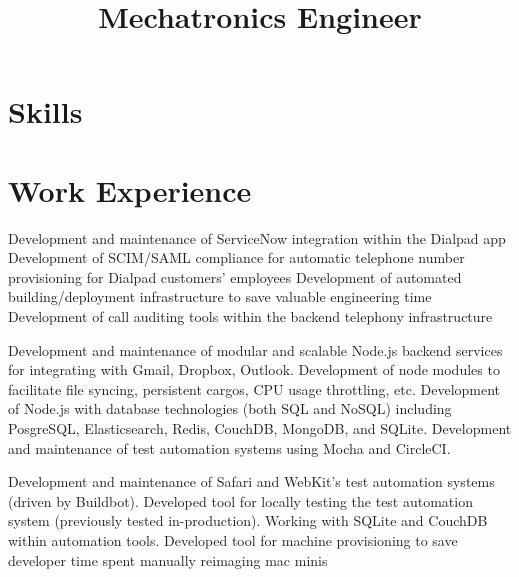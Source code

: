 \documentclass[11pt,a4paper]{moderncv}
\title{Mechatronics Engineer}               %
\begin{document}
\maketitle

\vspace{-13mm}

\section{Skills}


\section{Work Experience}
{ Development and maintenance of ServiceNow integration within the Dialpad app
    \newline{} Development of SCIM/SAML compliance for automatic telephone number provisioning for Dialpad customers' employees
    \newline{} Development of automated building/deployment infrastructure to save valuable engineering time
    \newline{} Development of call auditing tools within the backend telephony infrastructure}

{ Development and maintenance of modular and scalable Node.js backend services for integrating with Gmail, Dropbox, Outlook.
    \newline{} Development of node modules to facilitate file syncing, persistent cargos, CPU usage throttling, etc.
    \newline{} Development of Node.js with database technologies (both SQL and NoSQL) including PosgreSQL, Elasticsearch, Redis, CouchDB, MongoDB, and SQLite.
    \newline{} Development and maintenance of test automation systems using Mocha and CircleCI.}

{Development and maintenance of Safari and WebKit's test automation systems (driven by Buildbot).
    \newline{}Developed tool for locally testing the test automation system (previously tested in-production).
    \newline{}Working with SQLite and CouchDB within automation tools.
\newline{}Developed tool for machine provisioning to save developer time spent manually reimaging mac minis}
\end{document}
